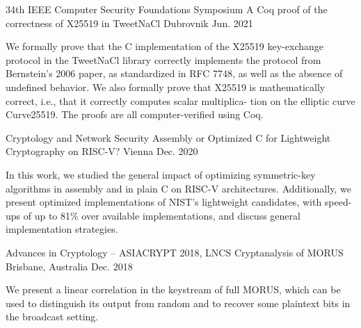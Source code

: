 {}


\begin{cventries}
	\cventry
	{34th IEEE Computer Security Foundations Symposium}
	{A Coq proof of the correctness of X25519 in TweetNaCl} %
	{Dubrovnik} %
	{Jun. 2021} %
	{
		\begin{cvitems} %
			\item {We formally prove that the C implementation of the X25519
			            key-exchange protocol in the TweetNaCl library correctly implements the protocol from Bernstein’s 2006 paper, as standardized in RFC 7748, as well
			            as the absence of undefined behavior. We also formally prove that X25519 is mathematically correct, i.e., that it correctly computes scalar multiplica-
			            tion on the elliptic curve Curve25519. The proofs are all computer-verified using Coq.}
		\end{cvitems}
	}

	\cventry
	{Cryptology and Network Security}
	{Assembly or Optimized C for Lightweight Cryptography on RISC-V?} %
	{Vienna} %
	{Dec. 2020} %
	{
		\begin{cvitems} %
			\item {In this work, we studied the general impact of optimizing symmetric-key algorithms in assembly and in plain C on RISC-V architectures. Additionally, we present optimized implementations of NIST's lightweight candidates, with speed-ups of up to 81\% over available implementations, and discuss general implementation strategies.}
		\end{cvitems}
	}

	\vspace{1em}
	\cventry
	{Advances in Cryptology – ASIACRYPT 2018, LNCS}
	{Cryptanalysis of MORUS} %
	{Brisbane, Australia} %
	{Dec. 2018} %
	{
		\begin{cvitems} %
			\item {We present a linear correlation in the keystream of full MORUS, which can be used to distinguish its output from random and to recover some plaintext bits in the broadcast setting.}
		\end{cvitems}
	}


\end{cventries}
